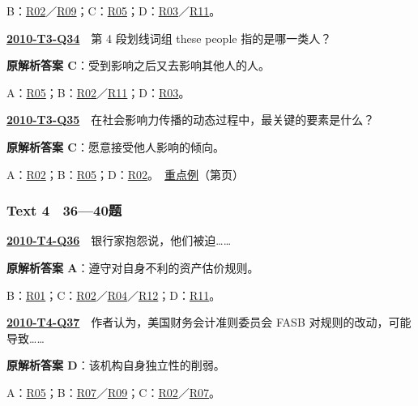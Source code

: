 \documentclass[11pt,a4paper]{article}
\begin{document}
\noindent B：\hyperref[cat-R02]{R02}／\hyperref[cat-R09]{R09}；C：\hyperref[cat-R05]{R05}；D：\hyperref[cat-R03]{R03}／\hyperref[cat-R11]{R11}。\par\smallskip
{}\label{idx-2010-T3-Q34}\noindent\textbf{\href{https://zj139.github.io/math-notes/english/2d3d87506df0a87664eef64d/\#q34}{2010-T3-Q34}}　第 4 段划线词组 these people 指的是哪一类人？\par\nopagebreak
\noindent\textbf{原解析答案 C}：受到影响之后又去影响其他人的人。\par\nopagebreak
\noindent A：\hyperref[cat-R05]{R05}；B：\hyperref[cat-R02]{R02}／\hyperref[cat-R11]{R11}；D：\hyperref[cat-R03]{R03}。\par\smallskip
{}\label{idx-2010-T3-Q35}\noindent\textbf{\href{https://zj139.github.io/math-notes/english/2d3d87506df0a87664eef64d/\#q35}{2010-T3-Q35}}　在社会影响力传播的动态过程中，最关键的要素是什么？\par\nopagebreak
\noindent\textbf{原解析答案 C}：愿意接受他人影响的倾向。\par\nopagebreak
\noindent A：\hyperref[cat-R02]{R02}；B：\hyperref[cat-R05]{R05}；D：\hyperref[cat-R02]{R02}。　\hyperref[case-2010-T3-Q35]{重点例}（第\pageref{case-2010-T3-Q35}页）\par\smallskip
{}\subsubsection{Text 4　36—40题}
\label{idx-2010-T4-Q36}\noindent\textbf{\href{https://zj139.github.io/math-notes/english/cc5bcd527d8ad5bbc083e9f6/\#q36}{2010-T4-Q36}}　银行家抱怨说，他们被迫……\par\nopagebreak
\noindent\textbf{原解析答案 A}：遵守对自身不利的资产估价规则。\par\nopagebreak
\noindent B：\hyperref[cat-R01]{R01}；C：\hyperref[cat-R02]{R02}／\hyperref[cat-R04]{R04}／\hyperref[cat-R12]{R12}；D：\hyperref[cat-R11]{R11}。\par\smallskip
{}\label{idx-2010-T4-Q37}\noindent\textbf{\href{https://zj139.github.io/math-notes/english/cc5bcd527d8ad5bbc083e9f6/\#q37}{2010-T4-Q37}}　作者认为，美国财务会计准则委员会 FASB 对规则的改动，可能导致……\par\nopagebreak
\noindent\textbf{原解析答案 D}：该机构自身独立性的削弱。\par\nopagebreak
\noindent A：\hyperref[cat-R05]{R05}；B：\hyperref[cat-R07]{R07}／\hyperref[cat-R09]{R09}；C：\hyperref[cat-R02]{R02}／\hyperref[cat-R07]{R07}。\par\smallskip
\end{document}
